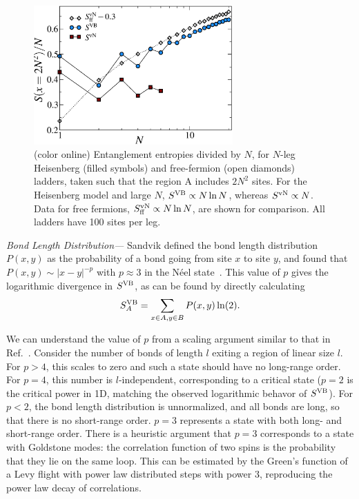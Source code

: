 \documentclass[prl,aps,twocolumn,floatfix,amsmath,amssymb,superscriptaddress,tightenlines]{revtex4}
\begin{document}
\begin{figure} { \includegraphics[width=3in]{fig4.eps} \caption{(color
online) Entanglement entropies divided by $N$,  for $N$-leg Heisenberg
(filled symbols) and free-fermion (open diamonds) ladders, taken such that
the region A includes $2N^2$ sites.  
%
For the Heisenberg model and large $N$, $S^{\rm VB}\propto N \ln N$,
whereas $S^{\rm vN}\propto N$.  
Data for free fermions, $S^{\rm vN}_{\rm ff}\propto N \ln N$,  are shown for comparison.
%
All ladders have 100 sites per leg.  \label{zigzag}}} \end{figure}

{\it Bond Length Distribution---} Sandvik defined the bond length
distribution $P(x,y)$ as the probability of a bond going from site $x$ to
site $y$, and found that $P(x,y)\sim |x-y|^{-p}$ with $p\approx 3$ in the
N\'eel state~\cite{Sandvik}.  This value of $p$ gives the logarithmic
divergence in $S^{\rm VB}$, as can be found by directly calculating
\begin{equation} 
S^{\rm VB}_{A}=\sum_{x\in A,y\in B} P(x,y)\ln (2).
\end{equation}


We can understand the value of $p$ from a scaling argument similar to that
in Ref.~\cite{network}.
Consider the number of bonds of length $l$ exiting a region of linear size $l$.  For $p>4$, this
scales to zero and such a state should have no long-range order.
For $p=4$, this number is $l$-independent, corresponding to a critical
state ($p=2$ is the critical power in 1D, matching the
observed logarithmic behavor of $S^{\rm VB}$).
For $p<2$, the bond length distribution is unnormalized, and all bonds are long, so that
there is no short-range order.  $p=3$ represents a state with both long-
and short-range order.  There is a heuristic argument that $p=3$ corresponds to a state
with Goldstone modes: the correlation function of two spins is the
probability that they lie on the same loop.  This can be
estimated by
the Green's function of a Levy flight with power law distributed steps with power $3$,
reproducing the power law decay of correlations.
\end{document}
